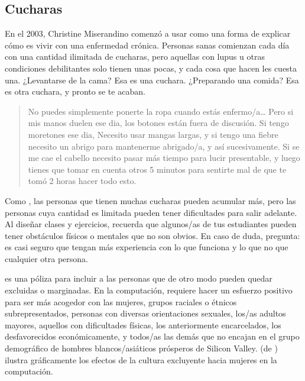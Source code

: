 \subsection*{Cucharas}

En el 2003,
Christine Miserandino comenzó a usar 
como una forma de explicar cómo es vivir con una enfermedad crónica.
Personas sanas comienzan cada día con una cantidad ilimitada de cucharas,
pero aquellas con lupus u otras condiciones debilitantes solo tienen unas pocas,
y cada cosa que hacen les cuesta una.
¿Levantarse de la cama?
Esa es una cuchara.
¿Preparando una comida?
Esa es otra cuchara, y pronto se te acaban.

\begin{quote}

  No puedes simplemente ponerte la ropa cuando estás enfermo/a{\dots}
  Pero si mis manos duelen ese dia, los botones están fuera de discusión.
  Si tengo moretones ese dia,
  Necesito usar mangas largas,
  y si tengo una fiebre necesito un abrigo para mantenerme abrigado/a, y así sucesivamente.
  Si se me cae el cabello necesito pasar más tiempo para lucir presentable,
  y luego tienes que tomar en cuenta otros 5 minutos para sentirte mal
  de que te tomó 2 horas hacer todo esto.

\end{quote}

Como ,
las personas que tienen muchas cucharas pueden acumular más,
pero las personas cuya cantidad es limitada pueden tener dificultades para salir adelante.
Al diseñar clases y ejercicios,
recuerda que algunos/as de tus estudiantes pueden tener obstáculos físicos o mentales que no son obvios.
En caso de duda, pregunta:
es casi seguro que tengan más experiencia con lo que funciona y lo que no que cualquier otra persona.


 es una póliza para
incluir a las personas que de otro modo pueden quedar excluidas o marginadas.
En la computación,
requiere hacer un esfuerzo positivo para ser más acogedor con las mujeres,
grupos raciales o étnicos subrepresentados,
personas con diversas orientaciones sexuales,
los/as adultos mayores,
aquellos con dificultades físicas,
los anteriormente encarcelados,
los desfavorecidos económicamente,
y todos/as las demás que no encajan en el grupo demográfico de hombres blancos/asiáticos prósperos de Silicon Valley.
 (de )
ilustra gráficamente los efectos de la cultura excluyente hacia mujeres en la computación.

